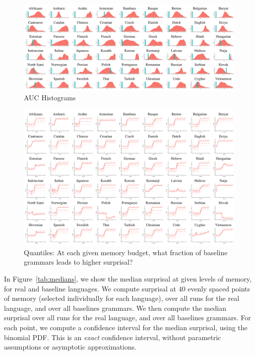 \begin{figure}
	\begin{center}
\includegraphics[width=\textwidth]{auc-table.pdf}
\end{center}
	\caption{AUC Histograms}\label{fig:auc}
\end{figure}



\begin{figure}
	\begin{center}
\includegraphics[width=\textwidth]{quantiles-table.pdf}
\end{center}
	\caption{Quantiles: At each given memory budget, what fraction of baseline grammars leads to higher surprisal?}\label{fig:quantile-table}
\end{figure}






In Figure~\ref{tab:medians}, we show the median surprisal at given levels of memory, for real and baseline languages.
We compute surprisal at 40 evenly spaced points of memory (selected individually for each language), over all runs for the real language, and over all baselines grammars.
We then compute the median surprisal over all runs for the real language, and over all baselines grammars.
For each point, we compute a confidence interval for the median surprisal, using the binomial PDF. 
This is an \emph{exact} confidence interval, without parametric assumptions or asymptotic approximations.

